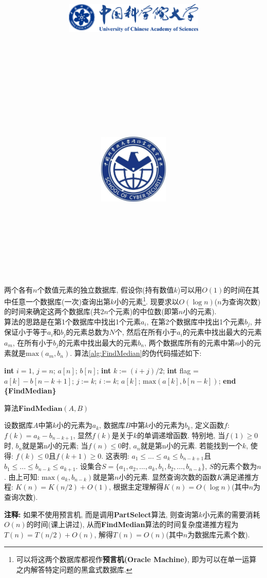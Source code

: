 \documentclass{article}
\title{
	\includegraphics[width=0.5\textwidth]{images/title/ucas_logo 1.pdf}\\
    \vspace{1in}
    \textmd{\textbf{\hmwkClass}}\\
	\textmd{\Large{\textbf{\hmwkClassID}}}\\
    \textmd{\textbf{\hmwkTitle}}\\
    \normalsize\vspace{0.1in}\large{\hmwkCompleteTime }\\
    \vspace{0.1in}\large{\textit{\hmwkClassInstructor\ }}\\
    \vspace{1in}
	\includegraphics[width=0.25\textwidth]{images/title/Cyber.jpg}\\
	\vspace{1in}
}
\author{
	\hmwkAuthorName \\ 
	\hmwkAuthorStuID \\
	\hmwkAuthorInst \\
	\hmwkAuthorzhuanye \\
	\hmwkAuthorfangxiang
	}
\date{}
\begin{document}
\maketitle


%
%
%
%
%


\begin{homeworkProblem}
	两个各有$n$个数值元素的独立数据库, 假设你(持有数值$k$)可以用$O(1)$的时间在其中任意一个数据库(一次)查询出第$k$小的元素\footnote{可以将这两个数据库都视作\textbf{预言机(Oracle Machine)}, 即为可以在单一运算之内解答特定问题的黑盒式数据库.}. 现要求以$O(\log n)$($n$为查询次数)的时间来确定这两个数据库(共$2n$个元素)的中位数(即第$n$小的元素).
	\\
	
	\solution 算法的思路是在第1个数据库中找出1个元素$a_i$, 在第2个数据库中找出1个元素$b_j$, 并保证小于等于$a_i$和$b_j$的元素总数为$N$个, 然后在所有小于$a_i$的元素中找出最大的元素$a_m$, 在所有小于$b_j$的元素中找出最大的元素$b_n$, 两个数据库所有的元素中第$n$小的元素就是$\text{max}(a_m,b_n)$. 算法\ref{alg:FindMedian}的伪代码描述如下:
	\begin{algorithm}[H]
		\begin{algorithmic}[1]
		\State \textbf{int} $i=1$, $j=n$;
		 
			\State \Return $a[n]$;
		\EndIf
		 
			\State \Return $b[n]$;
		\EndIf
			\State \textbf{int} $k:=(i+j)/2$;
			\State \textbf{int} flag = $a[k]-b[n-k+1]$; 
				\State $j:=k$;
				\State $i:=k$;
			\Else
				\State \Return $a[k]$;
			\EndIf
		\EndWhile
		\State \Return $\text{max}(a[k], b[n-k])$;
		\State \textbf{end \{FindMedian\}}
		\end{algorithmic}
		\caption{算法$\textbf{FindMedian}(A, B)$}
		\label{alg:FindMedian}
	\end{algorithm}
	设数据库$A$中第$k$小的元素为$a_k$, 数据库$B$中第$k$小的元素为$b_k$, 定义函数$f$: $f(k) = a_{k} - b_{n - k + 1}$, 显然$f(k)$是关于$k$的单调递增函数. 特别地, 当$f(1) \geq 0$时, $b_n$就是第n小的元素; 当$f(n) \leq 0$时, $a_n$就是第n小的元素. 若能找到一个$k$, 使得: ${f(k) \leq 0}$且$f(k + 1) \geq 0$. 这表明: $a_1 \leq ... \leq a_k \leq b_{n - k + 1}$且$b_1 \leq ... \leq b_{n-k} \leq a_{k+1}$. 设集合$S=\{a_1,a_2,...,a_k,b_1,b_2,...,b_{n-k}\}$, $S$的元素个数为$n$. 由上可知: $\text{max}(a_k,b_{n-k})$就是第$n$小的元素. 显然查询次数的函数$K$满足递推方程: $K(n) = K(n/2) + O(1)$, 根据主定理解得$K(n)=O(\log n)$(其中$n$为查询次数). 
	
	\textbf{注释:} 如果不使用预言机, 而是调用\textbf{PartSelect}算法, 则查询第$k$小元素的需要消耗$O(n)$的时间(课上讲过), 从而\textbf{FindMedian}算法的时间复杂度递推方程为$T(n)=T(n/2)+O(n)$, 解得$T(n)=O(n)$(其中$n$为数据库元素个数).
	\newpage
\end{homeworkProblem}
\end{document}
